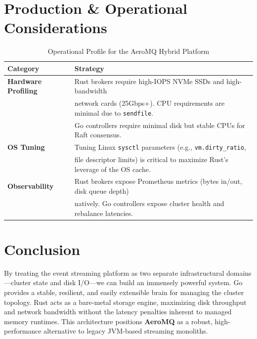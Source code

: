 \documentclass[11pt, a4paper]{article}
\begin{document}
\section{Production \& Operational Considerations}

\begin{table}[ht]
\centering
\begin{tabular}{@{}ll@{}}
\toprule
\textbf{Category} & \textbf{Strategy} \\ \midrule
\textbf{Hardware Profiling} & Rust brokers require high-IOPS NVMe SSDs and high-bandwidth \\
& network cards (25Gbps+). CPU requirements are minimal due to \texttt{sendfile}. \\
& Go controllers require minimal disk but stable CPUs for Raft consensus. \\ \addlinespace
\textbf{OS Tuning} & Tuning Linux \texttt{sysctl} parameters (e.g., \texttt{vm.dirty\_ratio}, \\
& file descriptor limits) is critical to maximize Rust's leverage of the OS cache. \\ \addlinespace
\textbf{Observability} & Rust brokers expose Prometheus metrics (bytes in/out, disk queue depth) \\
& natively. Go controllers expose cluster health and rebalance latencies. \\ \bottomrule
\end{tabular}
\caption{Operational Profile for the AeroMQ Hybrid Platform}
\end{table}

\section{Conclusion}
By treating the event streaming platform as two separate infrastructural domains—cluster state and disk I/O—we can build an immensely powerful system. Go provides a stable, resilient, and easily extensible brain for managing the cluster topology. Rust acts as a bare-metal storage engine, maximizing disk throughput and network bandwidth without the latency penalties inherent to managed memory runtimes. This architecture positions \textbf{AeroMQ} as a robust, high-performance alternative to legacy JVM-based streaming monoliths.
\end{document}

